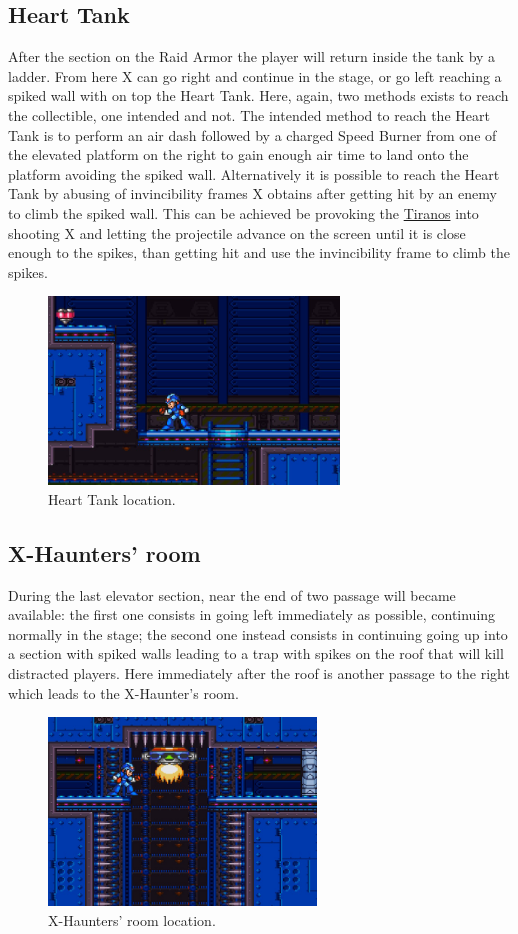\subsection{Heart Tank}
After the section on the Raid Armor the player will return inside the tank by a ladder. From here X can go right and continue in the stage, or go left reaching a spiked wall with on top the Heart Tank. Here, again, two methods exists to reach the collectible, one intended and not. The intended method to reach the Heart Tank is to perform an air dash followed by a charged Speed Burner from one of the elevated platform on the right to gain enough air time to land onto the platform avoiding the spiked wall. Alternatively it is possible to reach the Heart Tank by abusing of invincibility frames X obtains after getting hit by an enemy to climb the spiked wall. This can be achieved be provoking the \hyperlink {enem:Tiranos}{Tiranos} into shooting X and letting the projectile advance on the screen until it is close enough to the spikes, than getting hit and use the invincibility frame to climb the spikes.
\begin{figure}[htp]
	\centering
	\includegraphics[height=5cm]{figures/X2/Wheel_gator/Gator_heart.png}
	\caption{Heart Tank location.}
\end{figure}

\subsection{X-Haunters' room}
During the last elevator section, near the end of two passage will became available: the first one consists in going left immediately as possible, continuing normally in the stage; the second one instead consists in continuing going up into a section with spiked walls leading to a trap with spikes on the roof that will kill distracted players. Here immediately after the roof is another passage to the right which leads to the X-Haunter's room.
\begin{figure}[htp]
	\centering
	\includegraphics[height=5cm]{figures/X2/Wheel_gator/Gator_haunter_room.png}
	\caption{X-Haunters' room location.}
\end{figure}


